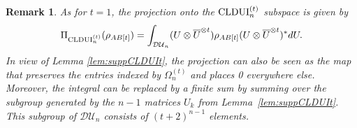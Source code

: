 \documentclass[11pt]{article}
\makeatletter
\newcommand{\Q}{\ensuremath{\mathbb{Q}}}   %
\newcommand{\R}{\ensuremath{\mathbb{R}}}   %
\newcommand{\C}{\ensuremath{\mathbb{C}}} %
\newcommand{\MDU}{{\mathcal {DU}}}
\newcommand{\Herm}{\mathrm{Herm}}
\newcommand{\CLDUI}{\text{\rm CLDUI}}
\newcommand{\ot}{\otimes}
\newcommand{\supp}{\text{\rm supp}}
\newcommand{\ui}{\underline{i}}
\newcommand{\uj}{\underline{j}}
\newcommand{\ovU}{\overline U}
\newcommand{\bfi}{\mathbf i}
\theoremstyle{plain}
\newtheorem{lemma}[satz]{Lemma}
\newtheorem{remark}[satz]{Remark}
\renewenvironment{proof}[1][\proofname]{%
  \par
  \pushQED{}%
  \normalfont
  \topsep6\p@\@plus6\p@
  \trivlist
  \item[\hskip\labelsep\itshape #1\@addpunct{.}]%
}{%
  \popQED
  \endtrivlist
}
\makeatother
\begin{document}
\begin{remark}\label{rem:finite-sum2}
    As for $t=1$, the projection onto the $\CLDUI^{(t)}_n$ subspace is given by 
\begin{align}\label{def:projCLDUIt}
    \Pi_{\CLDUI^{(t)}_n}(\rho_{AB[t]})=\int_{\MDU_n}(U\ot\overline{U}^{\ot t})\rho_{AB[t]}(U\ot\overline{U}^{\ot t})^*dU.
\end{align}
In view of Lemma \ref{lem:suppCLDUIt},  the projection can also be seen as the map that preserves the entries indexed by  $\Omega^{(t)}_n$ and places 0 everywhere else. Moreover, the integral can be replaced by a finite sum by summing over the subgroup generated by the $n-1$ matrices $U_k$ from Lemma~\ref{lem:suppCLDUIt}. This subgroup of $\MDU_n$ consists of $(t+2)^{n-1}$ elements.
\end{remark}



\end{document}
